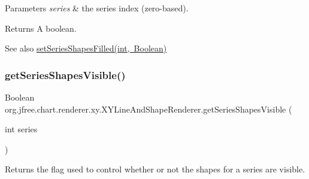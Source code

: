 \begin{DoxyParams}{Parameters}
{\em series} & the series index (zero-\/based).\\
\hline
\end{DoxyParams}
\begin{DoxyReturn}{Returns}
A boolean.
\end{DoxyReturn}
\begin{DoxySeeAlso}{See also}
\mbox{\hyperlink{classorg_1_1jfree_1_1chart_1_1renderer_1_1xy_1_1_x_y_line_and_shape_renderer_affefe89324f30c646e579244be329c2e}{set\+Series\+Shapes\+Filled(int, Boolean)}} 
\end{DoxySeeAlso}
\mbox{\label{classorg_1_1jfree_1_1chart_1_1renderer_1_1xy_1_1_x_y_line_and_shape_renderer_a3021273363552d317fa7cf150a012141}} 
\subsubsection{\texorpdfstring{get\+Series\+Shapes\+Visible()}{getSeriesShapesVisible()}}
{\footnotesize\ttfamily Boolean org.\+jfree.\+chart.\+renderer.\+xy.\+X\+Y\+Line\+And\+Shape\+Renderer.\+get\+Series\+Shapes\+Visible (\begin{DoxyParamCaption}\item[{int}]{series }\end{DoxyParamCaption})}

Returns the flag used to control whether or not the shapes for a series are visible.



